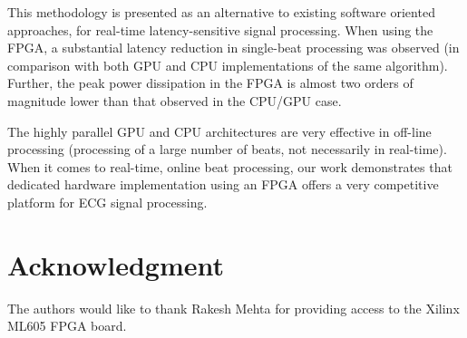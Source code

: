 \documentclass[conference]{IEEEtran}
\begin{document}
This methodology is presented as an alternative to existing software oriented approaches, 
for real-time latency-sensitive signal processing. When using the FPGA, a substantial
latency reduction in single-beat processing was observed (in comparison with both
GPU and CPU implementations of the same algorithm).  
Further, the peak power dissipation in
the FPGA is almost two orders of magnitude lower than that observed in the CPU/GPU case.

The highly parallel GPU and CPU architectures are very effective in off-line processing
(processing of a large number of beats, not necessarily in real-time).  When it comes to real-time,
online beat processing, our work demonstrates that dedicated hardware implementation
using an FPGA offers a very competitive platform for ECG signal processing.







\section*{Acknowledgment}

The authors would like to thank Rakesh Mehta for providing access to
the Xilinx ML605 FPGA board.






%
%
%




%
%




\end{document}

